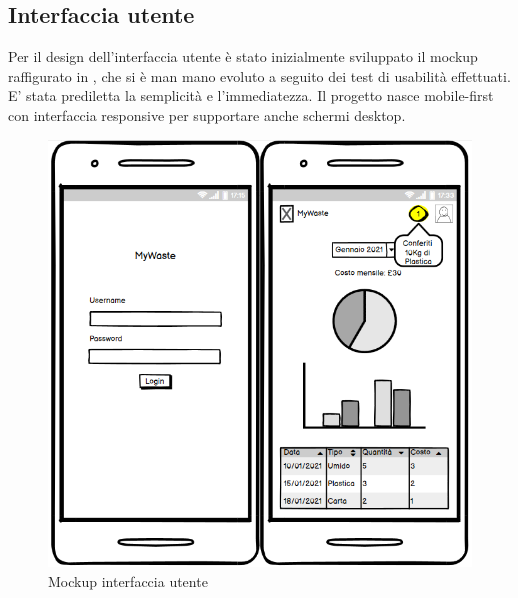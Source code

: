 \documentclass{report}
\begin{document}
\subsection{Interfaccia utente}
Per il design dell'interfaccia utente è stato inizialmente sviluppato il mockup raffigurato in , che si è
man mano evoluto a seguito dei test di usabilità effettuati. E' stata prediletta la semplicità e l'immediatezza.
Il progetto nasce mobile-first con interfaccia responsive per supportare anche schermi desktop.

\begin{figure}[h!]
    \centering
    \includegraphics[width=\textwidth]{mockup}
    \caption{Mockup interfaccia utente}
    \label{fig:mockup}
\end{figure}
\end{document}
